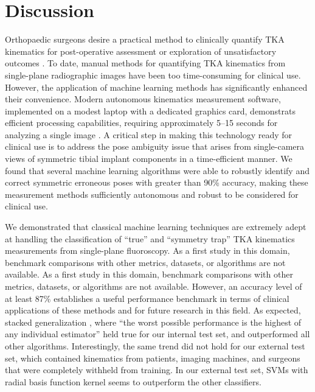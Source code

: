 \section{Discussion}
Orthopaedic surgeons desire a practical method to clinically quantify TKA kinematics for post-operative assessment or exploration of unsatisfactory outcomes \cite{banksWhatPostoperativeOutcome2017}.
To date, manual methods for quantifying TKA kinematics from single-plane radiographic images have been too time-consuming for clinical use. However, the application of machine learning methods has significantly enhanced their convenience\cite{jensenJointTrackMachine2023}.
Modern autonomous kinematics measurement software, implemented on a modest laptop with a dedicated graphics card, demonstrats efficient processing capabilities, requiring approximately 5–15 seconds for analyzing a single image \cite{jensenJointTrackMachine2023}.
A critical step in making this technology ready for clinical use is to address the pose ambiguity issue that arises from single-camera views of symmetric tibial implant components in a time-efficient manner.
We found that several machine learning algorithms were able to robustly identify and correct symmetric erroneous poses with greater than 90\% accuracy, making these measurement methods sufficiently autonomous and robust to be considered for clinical use.

We demonstrated that classical machine learning techniques are extremely adept at handling the classification of “true” and “symmetry trap” TKA kinematics measurements from single-plane fluoroscopy.
As a first study in this domain, benchmark comparisons with other metrics, datasets, or algorithms are not available.
As a first study in this domain, benchmark comparisons with other metrics, datasets, or algorithms are not available.
However, an accuracy level of at least 87\% establishes a useful performance benchmark in terms of clinical applications of these methods and for future research in this field.
As expected, stacked generalization \cite{wolpertStackedGeneralization1992,smythLinearlyCombiningDensity1999}, where “the worst possible performance is the highest of any individual estimator” held true for our internal test set, and outperformed all other algorithms.
Interestingly, the same trend did not hold for our external test set, which contained kinematics from patients, imaging machines, and surgeons that were completely withheld from training. In our external test set, SVMs with radial basis function kernel seems to outperform the other classifiers.


